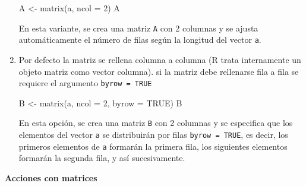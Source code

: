 \documentclass[
  jou,
  floatsintext,
  longtable,
  a4paper,
  nolmodern,
  notxfonts,
  notimes,
  colorlinks=true,linkcolor=blue,citecolor=blue,urlcolor=blue]{apa7}
\newenvironment{Shaded}{\begin{snugshade}}{\end{snugshade}}
\newcommand{\AttributeTok}[1]{\textcolor[rgb]{0.40,0.45,0.13}{#1}}
\newcommand{\ConstantTok}[1]{\textcolor[rgb]{0.56,0.35,0.01}{#1}}
\newcommand{\DecValTok}[1]{\textcolor[rgb]{0.68,0.00,0.00}{#1}}
\newcommand{\FunctionTok}[1]{\textcolor[rgb]{0.28,0.35,0.67}{#1}}
\newcommand{\NormalTok}[1]{\textcolor[rgb]{0.00,0.23,0.31}{#1}}
\newcommand{\OtherTok}[1]{\textcolor[rgb]{0.00,0.23,0.31}{#1}}
\begin{document}
\begin{enumerate}
\begin{Shaded}
\begin{Highlighting}[]
\NormalTok{A }\OtherTok{\textless{}{-}} \FunctionTok{matrix}\NormalTok{(a, }\AttributeTok{ncol =} \DecValTok{2}\NormalTok{)}
\NormalTok{A}
\end{Highlighting}
\end{Shaded}

  En esta variante, se crea una matriz \texttt{A} con 2 columnas y se
  ajusta automáticamente el número de filas según la longitud del vector
  \texttt{a}.
\item
  Por defecto la matriz se rellena columna a columna (R trata
  internamente un objeto matriz como vector columna). si la matriz debe
  rellenarse fila a fila se requiere el argumento
  \texttt{byrow\ =\ TRUE}

\begin{Shaded}
\begin{Highlighting}[]
\NormalTok{B }\OtherTok{\textless{}{-}} \FunctionTok{matrix}\NormalTok{(a, }\AttributeTok{ncol =} \DecValTok{2}\NormalTok{, }\AttributeTok{byrow =} \ConstantTok{TRUE}\NormalTok{)}
\NormalTok{B}
\end{Highlighting}
\end{Shaded}

  En esta opción, se crea una matriz \texttt{B} con 2 columnas y se
  especifica que los elementos del vector \texttt{a} se distribuirán por
  filas \texttt{byrow\ =\ TRUE}, es decir, los primeros elementos de
  \texttt{a} formarán la primera fila, los siguientes elementos formarán
  la segunda fila, y así sucesivamente.
\end{enumerate}

\textbf{Acciones con matrices}
\end{document}
